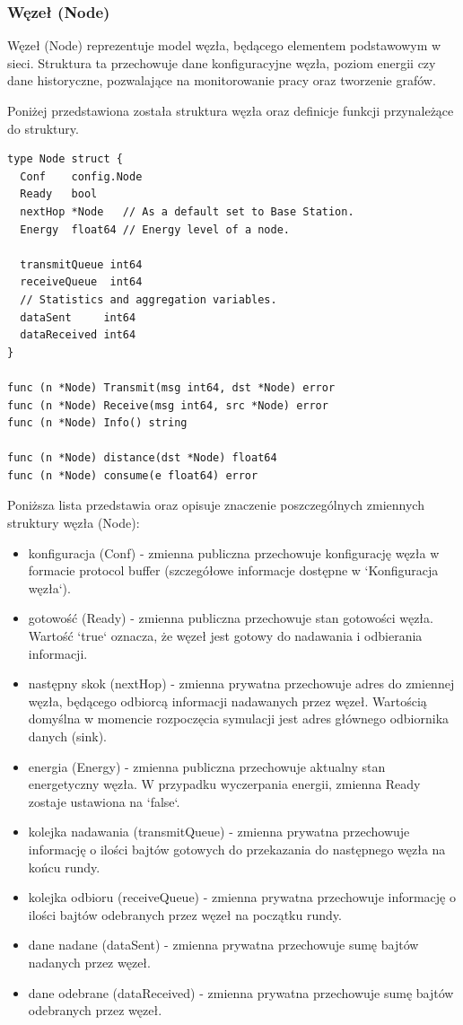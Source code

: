 \documentclass[a4paper,12pt,twoside,openany]{report}
\begin{document}
\subsubsection{Węzeł (Node)}

Węzeł (Node) reprezentuje model węzła, będącego elementem podstawowym w sieci. Struktura ta przechowuje dane konfiguracyjne węzła,
poziom energii czy dane historyczne, pozwalające na monitorowanie pracy oraz tworzenie grafów.

Poniżej przedstawiona została struktura węzła oraz definicje funkcji przynależące do struktury.

\begin{lstlisting}
type Node struct {
  Conf    config.Node
  Ready   bool
  nextHop *Node   // As a default set to Base Station.
  Energy  float64 // Energy level of a node.

  transmitQueue int64
  receiveQueue  int64
  // Statistics and aggregation variables.
  dataSent     int64
  dataReceived int64
}

func (n *Node) Transmit(msg int64, dst *Node) error
func (n *Node) Receive(msg int64, src *Node) error
func (n *Node) Info() string

func (n *Node) distance(dst *Node) float64
func (n *Node) consume(e float64) error
\end{lstlisting}

Poniższa lista przedstawia oraz opisuje znaczenie poszczególnych zmiennych struktury węzła (Node):

\begin{itemize}
 \item konfiguracja (Conf) - zmienna publiczna przechowuje konfigurację węzła w formacie protocol buffer (szczegółowe informacje dostępne w `Konfiguracja węzła`).
 \item gotowość (Ready) - zmienna publiczna przechowuje stan gotowości węzła. Wartość `true` oznacza, że węzeł jest gotowy do nadawania i odbierania informacji.
 \item następny skok (nextHop) - zmienna prywatna przechowuje adres do zmiennej węzła, będącego odbiorcą informacji nadawanych przez węzeł. Wartością domyślna w momencie
       rozpoczęcia symulacji jest adres głównego odbiornika danych (sink).
 \item energia (Energy) - zmienna publiczna przechowuje aktualny stan energetyczny węzła. W przypadku wyczerpania energii, zmienna Ready zostaje ustawiona na `false`.
 \item kolejka nadawania (transmitQueue) - zmienna prywatna przechowuje informację o ilości bajtów gotowych do przekazania do następnego węzła na końcu rundy.
 \item kolejka odbioru (receiveQueue) - zmienna prywatna przechowuje informację o ilości bajtów odebranych przez węzeł na początku rundy.
 \item dane nadane (dataSent) - zmienna prywatna przechowuje sumę bajtów nadanych przez węzeł.
 \item dane odebrane (dataReceived) - zmienna prywatna przechowuje sumę bajtów odebranych przez węzeł.
\end{itemize}
\end{document}

